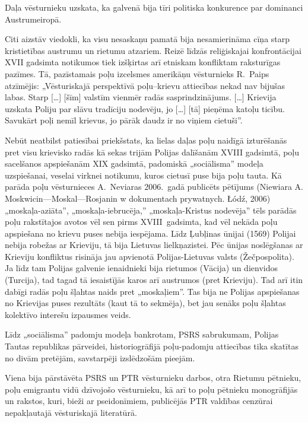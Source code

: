 \documentclass[twoside,a5paper,12pt,fleqn,openany]{extbook}
\newcommand{\citespace}{[\dots{}]}
\begin{document}
Daļa vēsturnieku uzskata, ka galvenā bija tīri politiska konkurence par dominanci Austrumeiropā.

Citi aizstāv viedokli, ka visu nesaskaņu pamatā bija nesamierināma cīņa starp kristietības austrumu un rietumu atzariem. Reizē līdzās reliģiskajai konfrontācijai XVII gadsimta notikumos tiek izšķirtas arī etniskam konfliktam raksturīgas pazīmes. Tā, pazīstamais poļu izcelsmes amerikāņu vēsturnieks R.~Paips atzīmējis: „Vēsturiskajā perspektīvā poļu--krievu attiecības nekad nav bijušas labas. Starp \citespace{} [šīm] valstīm vienmēr radās sasprindzinājums. \citespace{} Krievija uzskata Poliju par slāvu tradīciju nodevēju, jo \citespace{} [tā] pieņēma katoļu ticību. Savukārt poļi nemīl krievus, jo pārāk daudz ir no viņiem cietuši”.

Nebūt neatbilst patiesībai priekšstats, ka lielas daļas poļu naidīgā izturēšanās pret visu krievisko radās kā sekas trijām Polijas dalīšanām XVIII gadsimtā, poļu sacelšanos apspiešanām XIX gadsimtā, padomiskā „sociālisma” modeļa uzspiešanai, veselai virknei notikumu, kuros cietusī puse bija poļu tauta. Kā parāda poļu vēsturnieces A.~Neviaras 2006.~gadā publicēts pētījums (Niewiara A. Moskwicin—Moskal—Rosjanin w dokumentach prywatnych. Łódź, 2006) „moskaļa-aziāta”, „moskaļa-iebrucēja,” „moskaļa-Kristus nodevēja” tēls parādās poļu rakstītajos avotos vēl sen pirms XVIII~gadsimta, kad vēl nekāda poļu apspiešana no krievu puses nebija iespējama. Līdz Ļubļinas ūnijai (1569) Polijai nebija robežas ar Krieviju, tā bija Lietuvas lielkņazistei. Pēc ūnijas noslēgšanas ar Krieviju konfliktus risināja jau apvienotā Polijas-Lietuvas valsts (Žečpospolita). Ja līdz tam Polijas galvenie ienaidnieki bija rietumos (Vācija) un dienvidos (Turcija), tad tagad tā iesaistījās karos arī austrumos (pret Krieviju). Tad arī itin dabīgi radās poļu šļahtas naids pret „moskaļiem”. Tas bija ne Polijas apspiešanas no Krievijas puses rezultāts (kaut tā to sekmēja), bet jau senāks poļu šļahtas kolektīvo interešu izpausmes veids.

Līdz „sociālisma” padomju modeļa bankrotam, PSRS sabrukumam, Polijas Tautas republikas pārveidei, historiogrāfijā poļu-padomju attiecības tika skatītas no divām pretējām, savstarpēji izslēdzošām pieejām.

Viena bija pārstāvēta PSRS un PTR vēsturnieku darbos, otra Rietumu pētnieku, poļu emigrantu vidū dzīvojošo vēsturnieku, kā arī to poļu pētnieku monogrāfijās un rakstos, kuri, bieži ar pseidonīmiem, publicējās PTR valdības cenzūrai nepakļautajā vēsturiskajā literatūrā.
\end{document}
